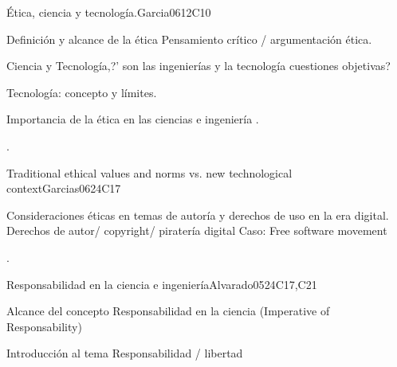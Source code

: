 \begin{syllabus}
\begin{competences}
    \item {}
    \item {}
    \item {}
    \item {}
\end{competences}
\begin{unit}{Ética, ciencia y tecnología.}{}{Garcia06}{12}{C10}
   \begin{topics}
      \item Definición y alcance de la ética Pensamiento crítico /  argumentación ética.
      \item Ciencia y Tecnología,?' son las ingenierías y la tecnología cuestiones objetivas? 
      \item Tecnología: concepto y límites.
      \item Importancia de la ética en las ciencias e ingeniería .
   \end{topics}
   \begin{learningoutcomes}
      \item .
   \end{learningoutcomes}
\end{unit}

\begin{unit}{Traditional ethical values and norms vs. new technological context}{}{Garcias06}{24}{C17}
   \begin{topics}
      \item Consideraciones éticas en temas de autoría y derechos de uso en la era digital. Derechos de autor/ copyright/ piratería digital  Caso: Free software movement
   \end{topics}

   \begin{learningoutcomes}
      \item .
   \end{learningoutcomes}
\end{unit}

\begin{unit}{Responsabilidad en la ciencia e ingeniería}{}{Alvarado05}{24}{C17,C21}
   \begin{topics}
      \item Alcance del concepto  Responsabilidad en la ciencia (Imperative of Responsability)
      \item Introducción al tema Responsabilidad / libertad 
      \end{topics}


\end{unit}
\end{syllabus}
